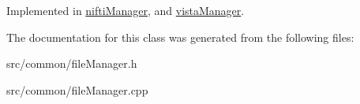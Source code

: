 \-Implemented in \hyperlink{classniftiManager_ac6b71cac86988cf30cb3a7eb2eeb5baa}{nifti\-Manager}, and \hyperlink{classvistaManager_a1863d9fa2c828230530c811c75bd335a}{vista\-Manager}.



\-The documentation for this class was generated from the following files\-:\begin{DoxyCompactItemize}
\item 
src/common/file\-Manager.\-h\item 
src/common/file\-Manager.\-cpp\end{DoxyCompactItemize}

